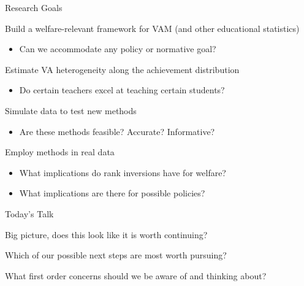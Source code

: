 \documentclass[t,aspectratio=169,11pt]{beamer}
\newenvironment{wideenumerate}{\enumerate\addtolength{\itemsep}{14pt}}{\endenumerate}
\begin{document}

\begin{frame}{Research Goals}

\begin{wideenumerate}
     \item Build a welfare-relevant framework for VAM (and other educational statistics) 
     \begin{itemize}
         \item Can we accommodate any policy or normative goal?
     \end{itemize}
    \item Estimate VA heterogeneity along the achievement distribution
    \begin{itemize}
        \item Do certain teachers excel at teaching certain students? 
    \end{itemize}
    \item Simulate data to test new methods
    \begin{itemize}
        \item Are these methods feasible? Accurate? Informative? 
    \end{itemize}
    \item Employ methods in real data
    \begin{itemize}
        \item What implications do rank inversions have for welfare?
        \item What implications are there for possible policies?
    \end{itemize}  

\end{wideenumerate}
\end{frame}

\begin{frame}[c]{Today's Talk}

\begin{wideenumerate}
    \item Big picture, does this look like it is worth continuing?
    \item Which of our possible next steps are most worth pursuing?
    \item What first order concerns should we be aware of and thinking about?

\end{wideenumerate}
\end{frame}
\end{document}
